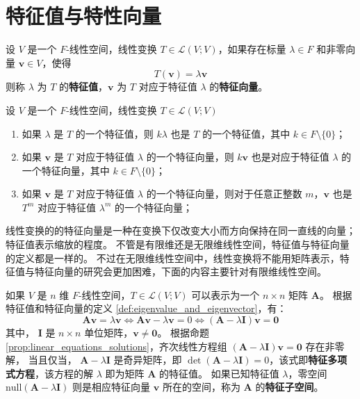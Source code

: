 \section{特征值与特性向量}

\begin{definition}
    设 $V$ 是一个 $F$-线性空间，线性变换 $T\in \mathcal{L}(V;V)$，如果存在标量 $\lambda\in F$ 和非零向量 $\mathbf{v}\in V$，使得
    \[
        T(\mathbf{v}) = \lambda \mathbf{v}
    \]
    则称 $\lambda$ 为 $T$ 的\textbf{特征值}，$\mathbf{v}$ 为 $T$ 对应于特征值 $\lambda$ 的\textbf{特征向量}。
    \label{def:eigenvalue_and_eigenvector}
\end{definition}

\begin{proposition}[特征值与特征向量的性质]
    设 $V$ 是一个 $F$-线性空间，线性变换 $T\in \mathcal{L}(V;V)$
    \begin{enumerate}
        \item 如果 $\lambda$ 是 $T$ 的一个特征值，则 $k\lambda$ 也是 $T$ 的一个特征值，其中 $k\in F\setminus \{0\}$；
        \item 如果 $\mathbf{v}$ 是 $T$ 对应于特征值 $\lambda$ 的一个特征向量，则 $k\mathbf{v}$ 也是对应于特征值 $\lambda$ 的一个特征向量，其中 $k\in F\setminus \{0\}$；
        \item 如果 $\mathbf{v}$ 是 $T$ 对应于特征值 $\lambda$ 的一个特征向量，则对于任意正整数 $m$，$\mathbf{v}$ 也是 $T^m$ 对应于特征值 $\lambda^m$ 的一个特征向量；
    \end{enumerate}
\end{proposition}

\begin{note}
    线性变换的的特征向量是一种在变换下仅改变大小而方向保持在同一直线的向量；特征值表示缩放的程度。
    不管是有限维还是无限维线性空间，特征值与特征向量的定义都是一样的。
    不过在无限维线性空间中，线性变换将不能用矩阵表示，特征值与特征向量的研究会更加困难，下面的内容主要针对有限维线性空间。
\end{note}

\vspace{1em}

如果 $V$ 是 $n$ 维 $F$-线性空间，$T\in \mathcal{L}(V;V)$ 可以表示为一个 $n\times n$ 矩阵 $\mathbf{A}$。
根据特征值和特征向量的定义 \ref{def:eigenvalue_and_eigenvector}，有：
\[
    \mathbf{A}\mathbf{v} = \lambda \mathbf{v} \iff \mathbf{A}\mathbf{v} - \lambda \mathbf{v} = 0 \iff (\mathbf{A} - \lambda \mathbf{I})\mathbf{v} = \mathbf{0}
\]
其中， $\mathbf{I}$ 是 $n\times n$ 单位矩阵，$\mathbf{v} \neq \mathbf{0}$。
根据命题 \ref{prop:linear_equations_solutions}，齐次线性方程组 $(\mathbf{A} - \lambda \mathbf{I})\mathbf{v} = \mathbf{0}$ 存在非零解，
当且仅当， $\mathbf{A} - \lambda \mathbf{I}$ 是奇异矩阵，即 $\det(\mathbf{A} - \lambda \mathbf{I}) = 0$，该式即\textbf{特征多项式方程}，该方程的解 $\lambda$ 即为矩阵 $\mathbf{A}$ 的特征值。
如果已知特征值 $\lambda$，零空间 $\mathrm{null}(\mathbf{A} - \lambda \mathbf{I})$ 则是相应特征向量 $\mathbf{v}$ 所在的空间，称为 $\mathbf{A}$ 的\textbf{特征子空间}。

